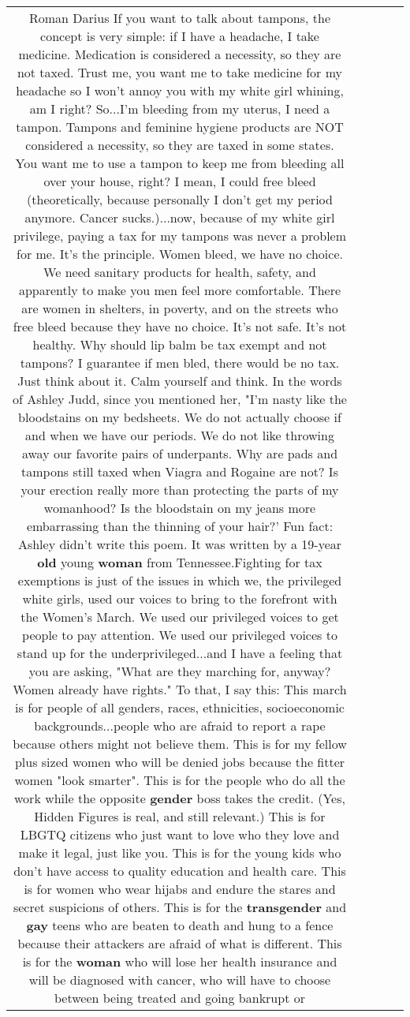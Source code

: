 \documentclass[11pt]{article}
\newlength\mylength
\begin{document}
\begin{center}
\begin{longtable}{|C{.65\mylength}|C{.30\mylength}|C{.12\mylength}|C{.12\mylength}|C{.12\mylength}|}
  \small Roman Darius If you want to talk about tampons, the concept is very simple: if I have a headache, I take medicine. Medication is considered a necessity, so they are not taxed. Trust me, you want me to take medicine for my headache so I won't annoy you with my white girl whining, am I right? So...I'm bleeding from my uterus, I need a tampon. Tampons and feminine hygiene products are NOT considered a necessity, so they are taxed in some states. You want me to use a tampon to keep me from bleeding all over your house, right? I mean, I could free bleed (theoretically, because personally I don't get my period anymore. Cancer sucks.)...now, because of my white girl privilege, paying a tax for my tampons was never a problem for me. It's the principle. Women bleed, we have no choice. We need sanitary products for health, safety, and apparently to make you men feel more comfortable. There are women in shelters, in poverty, and on the streets who free bleed because they have no choice. It's not safe. It's not healthy. Why should lip balm be tax exempt and not tampons? I guarantee if men bled, there would be no tax. Just think about it. Calm yourself and think. In the words of Ashley Judd, since you mentioned her, "I'm nasty like the bloodstains on my bedsheets. We do not actually choose if and when we have our periods. We do not like throwing away our favorite pairs of underpants. Why are pads and tampons still taxed when Viagra and Rogaine are not? Is your erection really more than protecting the parts of my womanhood? Is the bloodstain on my jeans more embarrassing than the thinning of your hair?' Fun fact: Ashley didn't write this poem. It was written by a 19-year \textbf{old} young \textbf{woman} from Tennessee.Fighting for tax exemptions is just of the issues in which we, the privileged white girls, used our voices to bring to the forefront with the Women's March. We used our privileged voices to get people to pay attention. We used our privileged voices to stand up for the underprivileged...and I have a feeling that you are asking, "What are they marching for, anyway? Women already have rights." To that, I say this: This march is for people of all genders, races, ethnicities, socioeconomic backgrounds...people who are afraid to report a rape because others might not believe them. This is for my fellow plus sized women who will be denied jobs because the fitter women "look smarter". This is for the people who do all the work while the opposite \textbf{gender} boss takes the credit. (Yes, Hidden Figures is real, and still relevant.) This is for LBGTQ citizens who just want to love who they love and make it legal, just like you. This is for the young kids who don't have access to quality education and health care. This is for women who wear hijabs and endure the stares and secret suspicions of others. This is for the \textbf{transgender} and \textbf{g\textbf{ay}} teens who are beaten to death and hung to a fence because their attackers are afraid of what is different. This is for the \textbf{woman} who will lose her health insurance and will be diagnosed with cancer, who will have to choose between being treated and going bankrupt or 
\end{longtable}
\end{center}
\end{document}
